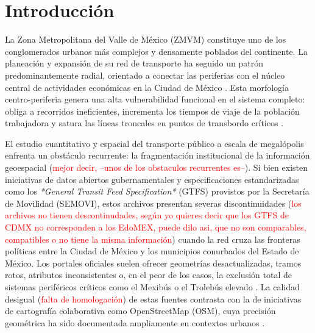 \documentclass{isprs} %
\begin{document}
\maketitle
\sloppy

\section{Introducción}
\label{sec:introduccion}

La Zona Metropolitana del Valle de México (ZMVM) constituye uno de los conglomerados urbanos más complejos y densamente poblados del continente. La planeación y expansión de su red de transporte ha seguido un patrón predominantemente radial, orientado a conectar las periferias con el núcleo central de actividades económicas en la Ciudad de México \citep{padilla2022expansion, molinero2002}.  Esta morfología centro-periferia genera una alta vulnerabilidad funcional en el sistema completo: obliga a recorridos ineficientes, incrementa los tiempos de viaje de la población trabajadora y satura las líneas troncales en puntos de transbordo críticos \citep{semovi2020diagnostico}.

El estudio cuantitativo y espacial del transporte público a escala de megalópolis enfrenta un obstáculo recurrente: la fragmentación institucional de la información geoespacial (\textcolor{red}{mejor decir, --unos de los obstaculos recurrentes es--}).  Si bien existen iniciativas de datos abiertos gubernamentales y especificaciones estandarizadas como los \textit{*General Transit Feed Specification*} (GTFS) provistos por la Secretaría de Movilidad (SEMOVI), estos archivos presentan severas discontinuidades (\textcolor{red}{los archivos no tienen descontinudades, según yo quieres decir que los GTFS de CDMX no corresponden a los EdoMEX, puede dilo asi, que no son comparables, compatibles o no tiene la misma información}) cuando la red cruza las fronteras políticas entre la Ciudad de México y los municipios conurbados del Estado de México.  Los portales oficiales suelen ofrecer geometrías desactualizadas, tramos rotos, atributos inconsistentes o, en el peor de los casos, la exclusión total de sistemas periféricos críticos como el Mexibús o el Trolebús elevado \citep{semovi2020diagnostico}.  La calidad desigual (\textcolor{red}{falta de homologación}) de estas fuentes contrasta con la de iniciativas de cartografía colaborativa como OpenStreetMap (OSM), cuya precisión geométrica ha sido documentada ampliamente en contextos urbanos \citep{hadas2013assessing}.
\end{document}
